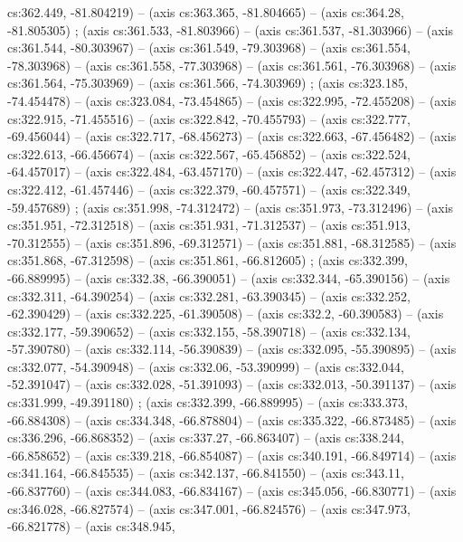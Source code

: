   cs:362.449, -81.804219) -- (axis cs:363.365, -81.804665) -- (axis cs:364.28,
  -81.805305) ;  (axis cs:361.533, -81.803966) --
  (axis cs:361.537, -81.303966) -- (axis cs:361.544, -80.303967) -- (axis
  cs:361.549, -79.303968) -- (axis cs:361.554, -78.303968) -- (axis
  cs:361.558, -77.303968) -- (axis cs:361.561, -76.303968) -- (axis
  cs:361.564, -75.303969) -- (axis cs:361.566, -74.303969)
  ;  (axis cs:323.185, -74.454478) -- (axis
  cs:323.084, -73.454865) -- (axis cs:322.995, -72.455208) -- (axis
  cs:322.915, -71.455516) -- (axis cs:322.842, -70.455793) -- (axis
  cs:322.777, -69.456044) -- (axis cs:322.717, -68.456273) -- (axis
  cs:322.663, -67.456482) -- (axis cs:322.613, -66.456674) -- (axis
  cs:322.567, -65.456852) -- (axis cs:322.524, -64.457017) -- (axis
  cs:322.484, -63.457170) -- (axis cs:322.447, -62.457312) -- (axis
  cs:322.412, -61.457446) -- (axis cs:322.379, -60.457571) -- (axis
  cs:322.349, -59.457689) ;  (axis cs:351.998,
  -74.312472) -- (axis cs:351.973, -73.312496) -- (axis cs:351.951,
  -72.312518) -- (axis cs:351.931, -71.312537) -- (axis cs:351.913,
  -70.312555) -- (axis cs:351.896, -69.312571) -- (axis cs:351.881,
  -68.312585) -- (axis cs:351.868, -67.312598) -- (axis cs:351.861,
  -66.812605) ;  (axis cs:332.399, -66.889995) --
  (axis cs:332.38, -66.390051) -- (axis cs:332.344, -65.390156) -- (axis
  cs:332.311, -64.390254) -- (axis cs:332.281, -63.390345) -- (axis
  cs:332.252, -62.390429) -- (axis cs:332.225, -61.390508) -- (axis cs:332.2,
  -60.390583) -- (axis cs:332.177, -59.390652) -- (axis cs:332.155,
  -58.390718) -- (axis cs:332.134, -57.390780) -- (axis cs:332.114,
  -56.390839) -- (axis cs:332.095, -55.390895) -- (axis cs:332.077,
  -54.390948) -- (axis cs:332.06, -53.390999) -- (axis cs:332.044, -52.391047)
  -- (axis cs:332.028, -51.391093) -- (axis cs:332.013, -50.391137) -- (axis
  cs:331.999, -49.391180) ;  (axis cs:332.399,
  -66.889995) -- (axis cs:333.373, -66.884308) -- (axis cs:334.348,
  -66.878804) -- (axis cs:335.322, -66.873485) -- (axis cs:336.296,
  -66.868352) -- (axis cs:337.27, -66.863407) -- (axis cs:338.244, -66.858652)
  -- (axis cs:339.218, -66.854087) -- (axis cs:340.191, -66.849714) -- (axis
  cs:341.164, -66.845535) -- (axis cs:342.137, -66.841550) -- (axis cs:343.11,
  -66.837760) -- (axis cs:344.083, -66.834167) -- (axis cs:345.056,
  -66.830771) -- (axis cs:346.028, -66.827574) -- (axis cs:347.001,
  -66.824576) -- (axis cs:347.973, -66.821778) -- (axis cs:348.945,
